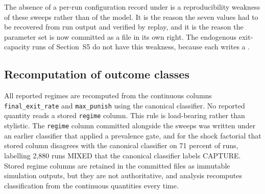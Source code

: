 \documentclass[12pt]{article}
\begin{document}
The absence of a per-run configuration record under  is a
reproducibility weakness of these sweeps rather than of the model. It is the
reason the seven values had to be recovered from run output and verified by
replay, and it is the reason the parameter set is now committed as a file in its
own right. The endogenous exit-capacity runs of Section~S5 do not have this
weakness, because each writes a .

\subsection{Recomputation of outcome classes}

All reported regimes are recomputed from the continuous columns
\texttt{final\_exit\_rate} and \texttt{max\_punish} using the canonical
classifier. No reported quantity reads a stored \texttt{regime} column. This
rule is load-bearing rather than stylistic. The \texttt{regime} column committed
alongside the  sweeps was written under an earlier classifier that
applied a prevalence gate, and for the shock factorial that stored column
disagrees with the canonical classifier on 71 percent of runs, labelling 2,880
runs MIXED that the canonical classifier labels CAPTURE. Stored regime columns
are retained in the committed files as immutable simulation outputs, but they
are not authoritative, and analysis recomputes classification from the
continuous quantities every time.
\end{document}
